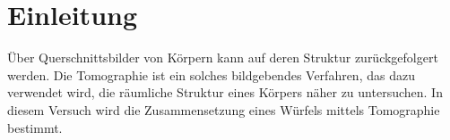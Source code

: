 \section{Einleitung}
Über Querschnittsbilder von Körpern kann auf deren Struktur zurückgefolgert werden.
Die Tomographie ist ein solches bildgebendes Verfahren, das dazu verwendet wird, die räumliche Struktur eines Körpers näher zu untersuchen.
In diesem Versuch wird die Zusammensetzung eines Würfels mittels Tomographie bestimmt.

